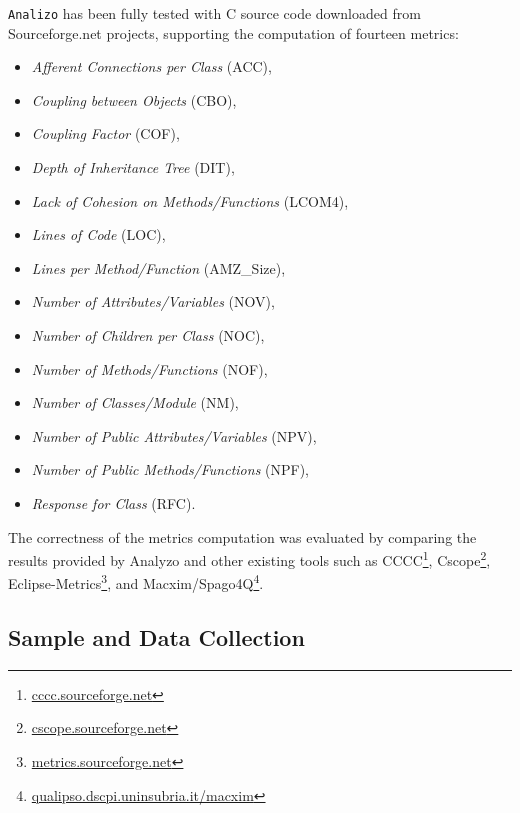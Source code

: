 \documentclass[conference]{IEEEtran}
\begin{document}
\texttt{Analizo} has been fully tested with C source code downloaded from 
Sourceforge.net projects, supporting the computation of  fourteen metrics:
\begin{itemize}
\item \emph{Afferent Connections per Class} (ACC),
\item \emph{Coupling between Objects} (CBO),
\item \emph{Coupling Factor} (COF),
\item \emph{Depth of Inheritance Tree} (DIT),
\item \emph{Lack of Cohesion on Methods/Functions} (LCOM4),
\item \emph{Lines of Code} (LOC),
\item \emph{Lines per Method/Function} (AMZ\_Size),
\item \emph{Number of Attributes/Variables} (NOV),
\item \emph{Number of Children per Class} (NOC),
\item \emph{Number of Methods/Functions} (NOF),
\item \emph{Number of Classes/Module} (NM),
\item \emph{Number of Public Attributes/Variables} (NPV),
\item \emph{Number of Public Methods/Functions} (NPF),
\item \emph{Response for Class} (RFC).
\end{itemize}
The correctness of the metrics computation was evaluated by comparing the 
results provided by Analyzo and other existing tools such as
%
CCCC\footnote{\url{cccc.sourceforge.net}},
Cscope\footnote{\url{cscope.sourceforge.net}},
Eclipse-Metrics\footnote{\url{metrics.sourceforge.net}},
and Macxim/Spago4Q\footnote{\url{qualipso.dscpi.uninsubria.it/macxim}}.

\subsection{Sample and Data Collection}
\label{sdcollection}
\end{document}
